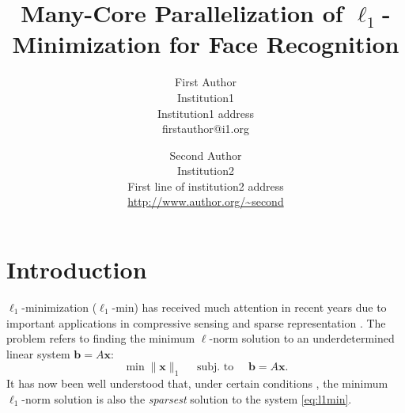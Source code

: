 \documentclass[10pt,twocolumn,letterpaper]{article}
\def\tt{{\boldsymbol{t}}}
\def\bb{{\boldsymbol{b}}}
\def\xx{{\boldsymbol{x}}}
\begin{document}
\title{Many-Core Parallelization of $\ell_1$-Minimization for Face Recognition
}

\author{First Author\\
Institution1\\
Institution1 address\\
{\tt\small firstauthor@i1.org}
\and
Second Author\\
Institution2\\
First line of institution2 address\\
{\small\url{http://www.author.org/~second}}
}

\maketitle

\begin{abstract}

\end{abstract}

\section{Introduction} 

$\ell_1$-minimization ($\ell_1$-min) has received much attention in recent years due to important applications
in compressive sensing \cite{BrucksteinA2007} and sparse representation \cite{WrightJ2010-PIEEE}.
The problem refers to finding the minimum $\ell$-norm solution to an underdetermined linear system $\bb=A\xx$:
\begin{equation}
\min \|\xx\|_1\quad \mbox{ subj. to }\quad \bb = A\xx.
\label{eq:l1min}
\end{equation}
It has now been well understood that, under certain conditions \cite{CandesE2005-IT_1,DonohoD2004}, the minimum $\ell_1$-norm solution is
also the \emph{sparsest} solution to the system \eqref{eq:l1min}.
\end{document}
